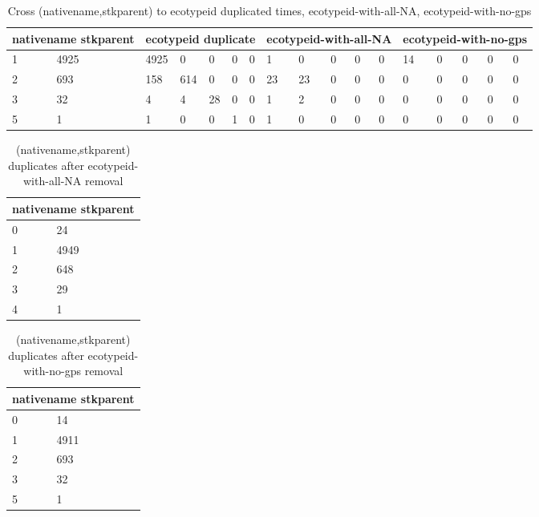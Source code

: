 \begin{center}
\begin{longtable}{|l|l|l|l|l|l|l|l|l|l|l|l|l|l|l|l|l|}
\caption{ Cross (nativename,stkparent) to ecotypeid duplicated times, ecotypeid-with-all-NA,  ecotypeid-with-no-gps} \label{t_nn_sp_e_1}\\
\hline
\multicolumn{2}{|c|}{nativename stkparent}&\multicolumn{5}{|c|}{ecotypeid duplicate}&\multicolumn{5}{|c|}{ecotypeid-with-all-NA}&\multicolumn{5}{|c|}{ecotypeid-with-no-gps}\\
\hline
1&4925&4925&0&0&0&0&1&0&0&0&0&14&0&0&0&0\\
2&693&158&614&0&0&0&23&23&0&0&0&0&0&0&0&0\\
3&32&4&4&28&0&0&1&2&0&0&0&0&0&0&0&0\\
5&1&1&0&0&1&0&1&0&0&0&0&0&0&0&0&0\\
\hline
\end{longtable}
\end{center}
\begin{center}
\begin{longtable}{|l|l|}
\caption{ (nativename,stkparent) duplicates after ecotypeid-with-all-NA removal} \label{t_nn_sp_e_2}\\
\hline
\multicolumn{2}{|c|}{nativename stkparent}\\
\hline
0&24\\
1&4949\\
2&648\\
3&29\\
4&1\\
\hline
\end{longtable}
\end{center}
\begin{center}
\begin{longtable}{|l|l|}
\caption{ (nativename,stkparent) duplicates after ecotypeid-with-no-gps removal} \label{t_nn_sp_e_3}\\
\hline
\multicolumn{2}{|c|}{nativename stkparent}\\
\hline
0&14\\
1&4911\\
2&693\\
3&32\\
5&1\\
\hline
\end{longtable}
\end{center}
